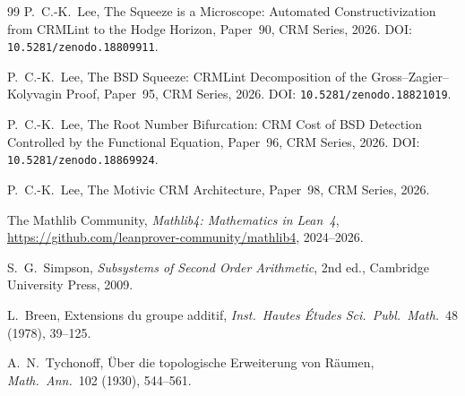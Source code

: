 \documentclass[11pt,a4paper]{article}
\theoremstyle{plain}
\theoremstyle{definition}
\begin{document}
\begin{thebibliography}{99}
P.~C.-K.~Lee,
The Squeeze is a Microscope: Automated Constructivization from
CRMLint to the Hodge Horizon,
Paper~90, CRM Series, 2026.
DOI: \texttt{10.5281/zenodo.18809911}.

P.~C.-K.~Lee,
The BSD Squeeze: CRMLint Decomposition of the Gross--Zagier--Kolyvagin
Proof,
Paper~95, CRM Series, 2026.
DOI: \texttt{10.5281/zenodo.18821019}.

P.~C.-K.~Lee,
The Root Number Bifurcation: CRM Cost of BSD Detection Controlled
by the Functional Equation,
Paper~96, CRM Series, 2026.
DOI: \texttt{10.5281/zenodo.18869924}.

P.~C.-K.~Lee,
The Motivic CRM Architecture,
Paper~98, CRM Series, 2026.

The Mathlib Community,
\emph{Mathlib4: Mathematics in Lean~4},
\url{https://github.com/leanprover-community/mathlib4}, 2024--2026.

S.~G.~Simpson,
\emph{Subsystems of Second Order Arithmetic},
2nd ed., Cambridge University Press, 2009.

L.~Breen,
Extensions du groupe additif,
\emph{Inst.\ Hautes \'Etudes Sci.\ Publ.\ Math.}~48 (1978), 39--125.

A.~N.~Tychonoff,
\"Uber die topologische Erweiterung von R\"aumen,
\emph{Math.\ Ann.}~102 (1930), 544--561.

\end{thebibliography}
\end{document}
